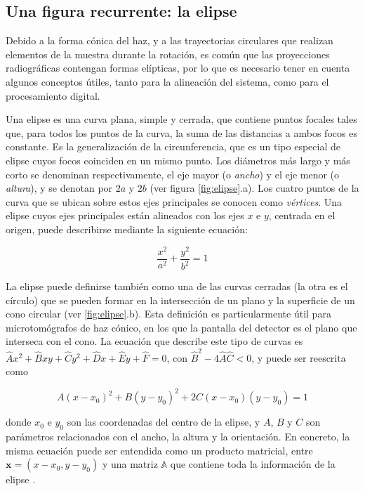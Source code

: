 \subsection{Una figura recurrente: la elipse}

Debido a la forma cónica del haz, y a las trayectorias circulares que realizan elementos
de la muestra durante la rotación, es común que las proyecciones radiográficas contengan
formas elípticas, por lo que es necesario tener en cuenta algunos conceptos útiles, tanto
para la alineación del sistema, como para el procesamiento digital.

Una elipse es una curva plana, simple y cerrada, que contiene puntos focales tales que,
para todos los puntos de la curva, la suma de las distancias a ambos focos es constante.
Es la generalización de la circunferencia, que es un tipo especial de elipse cuyos focos
coinciden en un mismo punto. Los diámetros más largo y más corto se denominan respectivamente,
el eje mayor (o \textit{ancho}) y el eje menor (o \textit{altura}), y se denotan por $2a$ y $2b$
(ver figura \ref{fig:elipse}.a). Los cuatro puntos de la curva que se ubican sobre estos ejes principales se conocen como 
\textit{vértices}. Una elipse cuyos ejes principales están alineados con los ejes $x$ e $y$,
centrada en el origen, puede describirse mediante la siguiente ecuación:

\begin{equation}
    \frac{x^2}{a^2} + \frac{y^2}{b^2} = 1
    \label{eq:elipse_simple}
\end{equation}

La elipse puede definirse también como una de las curvas cerradas (la otra es el
círculo) que se pueden formar en la intersección de un plano y la superficie de un cono
circular (ver \ref{fig:elipse}.b). Esta definición es particularmente útil para
microtomógrafos de haz cónico, en los que la pantalla del detector es el plano que interseca con
el cono. La ecuación que describe este tipo de curvas es $\hat{A}x^2 + \hat{B}xy +
\hat{C}y^2 + \hat{D}x + \hat{E}y + \hat{F} = 0$, con $\hat{B}^2 - 4\hat{A}\hat{C} < 0$, y puede ser reescrita
como

\begin{equation}
    A(x-x_0)^2 + B(y-y_0)^2 + 2C(x-x_0)(y-y_0) = 1
    \label{eq:elipse}
\end{equation}

\noindent donde $x_0$ e $y_0$ son las coordenadas del centro de la elipse, y $A$, $B$ y $C$ son
parámetros relacionados con el ancho, la altura y la orientación. En concreto, la misma ecuación
puede ser entendida como un producto matricial, entre $\mathbf{x}=(x-x_0, y-y_0)$ y una
matriz $\mathbb{A}$ que contiene toda la información de la elipse \cite{Strang2016}.

